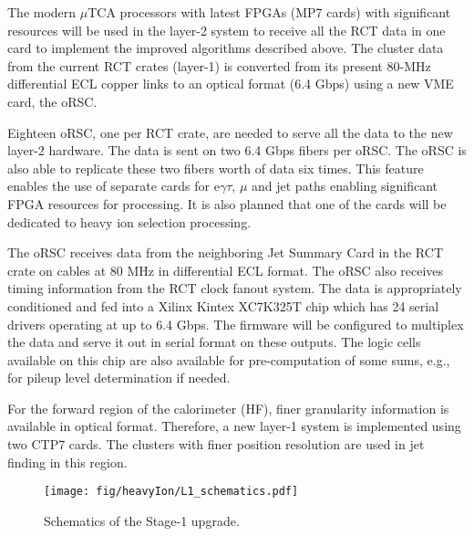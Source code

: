 The modern $\mu$TCA processors with latest FPGAs (MP7 cards) with
significant resources will be used in the layer-2 system to receive
all the RCT data in one card to implement the improved algorithms
described above.  The cluster data from the current RCT crates
(layer-1) is converted from its present 80-MHz differential ECL copper
links to an optical format (6.4 Gbps) using a new VME card, the oRSC.

Eighteen oRSC, one per RCT crate, are needed to serve all the data
to the new layer-2 hardware.  The data is sent on two 6.4 Gbps fibers
per oRSC. The oRSC is also able to replicate these two fibers worth
of data six times.  This feature enables the use of separate 
cards for e$\gamma\tau$, $\mu$ and jet paths enabling significant
FPGA resources for processing.  It is also planned that one of the cards will be dedicated to heavy ion
selection processing. 

The oRSC receives data from the neighboring Jet Summary Card in the
RCT crate on cables at 80 MHz in differential ECL format. The oRSC
also receives timing information from the RCT clock fanout system.
The data is appropriately conditioned and fed into a Xilinx Kintex
XC7K325T chip which has 24 serial drivers operating at up to 6.4 Gbps.
The firmware will be configured to multiplex the data and serve it out
in serial format on these outputs.  The logic cells available on this
chip are also available for pre-computation of some sums, e.g., for
pileup level determination if needed.

For the forward region of the calorimeter (HF), finer granularity 
information is available in optical format.  Therefore, a new layer-1 
system is implemented using two CTP7 cards.  The clusters with finer
position resolution are used in jet finding in this region. 

\begin{figure}
\begin{center}
\vspace{.2in}
\centerline {
\texttt{[image: fig/heavyIon/L1\_schematics.pdf]}
}
\vspace{.2in}
\end{center}
\caption{Schematics of the Stage-1 upgrade.
\label{fig:L1_Stage1} }
\end{figure}


